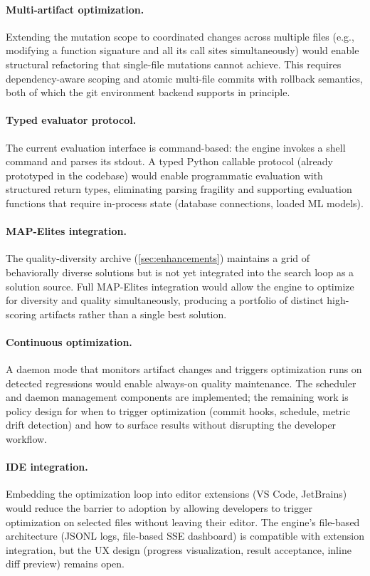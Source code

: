 \paragraph{Multi-artifact optimization.}
Extending the mutation scope to coordinated changes across multiple files (e.g., modifying a function signature and all its call sites simultaneously) would enable structural refactoring that single-file mutations cannot achieve.
This requires dependency-aware scoping and atomic multi-file commits with rollback semantics, both of which the git environment backend supports in principle.

\paragraph{Typed evaluator protocol.}
The current evaluation interface is command-based: the engine invokes a shell command and parses its stdout.
A typed Python callable protocol (already prototyped in the codebase) would enable programmatic evaluation with structured return types, eliminating parsing fragility and supporting evaluation functions that require in-process state (database connections, loaded ML models).

\paragraph{MAP-Elites integration.}
The quality-diversity archive (\cref{sec:enhancements}) maintains a grid of behaviorally diverse solutions but is not yet integrated into the search loop as a solution source.
Full MAP-Elites integration would allow the engine to optimize for diversity and quality simultaneously, producing a portfolio of distinct high-scoring artifacts rather than a single best solution.

\paragraph{Continuous optimization.}
A daemon mode that monitors artifact changes and triggers optimization runs on detected regressions would enable always-on quality maintenance.
The scheduler and daemon management components are implemented; the remaining work is policy design for when to trigger optimization (commit hooks, schedule, metric drift detection) and how to surface results without disrupting the developer workflow.

\paragraph{IDE integration.}
Embedding the optimization loop into editor extensions (VS Code, JetBrains) would reduce the barrier to adoption by allowing developers to trigger optimization on selected files without leaving their editor.
The engine's file-based architecture (JSONL logs, file-based SSE dashboard) is compatible with extension integration, but the UX design (progress visualization, result acceptance, inline diff preview) remains open.
